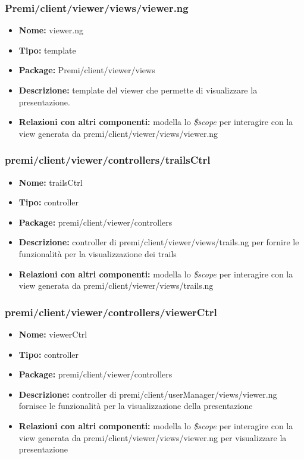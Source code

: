 \subsubsection{Premi/client/viewer/views/viewer.ng}
\begin{itemize}
  \item[] \textbf{Nome:} viewer.ng
  \item[] \textbf{Tipo:} template
  \item[] \textbf{Package:} Premi/client/viewer/views
  \item[] \textbf{Descrizione:} template del viewer che permette di visualizzare la presentazione.
  \item[] \textbf{Relazioni con altri componenti:} modella lo \textit{\$scope} per interagire con la view generata da premi/client/viewer/views/viewer.ng
\end{itemize}
\subsubsection{premi/client/viewer/controllers/trailsCtrl}
\begin{itemize}
  \item[] \textbf{Nome:} trailsCtrl
  \item[] \textbf{Tipo:} controller
  \item[] \textbf{Package:} premi/client/viewer/controllers
  \item[] \textbf{Descrizione:} controller di premi/client/viewer/views/trails.ng per fornire le funzionalità per la visualizzazione dei trails
  \item[] \textbf{Relazioni con altri componenti:} modella lo \textit{\$scope} per interagire con la view generata da premi/client/viewer/views/trails.ng
\end{itemize}
\subsubsection{premi/client/viewer/controllers/viewerCtrl}
\begin{itemize}
  \item[] \textbf{Nome:} viewerCtrl
  \item[] \textbf{Tipo:} controller
  \item[] \textbf{Package:} premi/client/viewer/controllers
  \item[] \textbf{Descrizione:} controller di premi/client/userManager/views/viewer.ng fornisce le funzionalità per la visualizzazione della presentazione
  \item[] \textbf{Relazioni con altri componenti:} modella lo \textit{\$scope} per interagire con la view generata da premi/client/viewer/views/viewer.ng per visualizzare la presentazione
\end{itemize}

